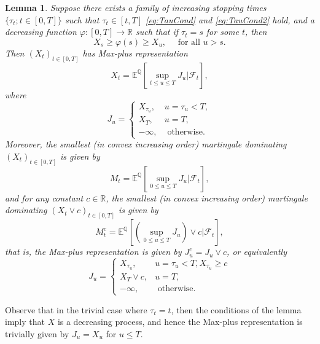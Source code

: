 \documentclass[a4paper]{amsart}
\newtheorem{lemma}[theorem]{Lemma}
\theoremstyle{definition}
\theoremstyle{remark}
\numberwithin{equation}{section}
\newcommand{\E}{\mathbb{E}}
\newcommand{\Q}{\mathbb{Q}}
\newcommand{\R}{\mathbb{R}}
\newcommand{\Fc}{\mathcal{F}}
\newcommand{\Eq}[1]{\E^{\Q}\left[#1\right]}
\begin{document}
\begin{lemma}\label{lemma:A1}
  Suppose there exists a family of increasing stopping times $\{\tau_t; t\in[0,T]\}$ such that $\tau_t \in [t,T]$ \eqref{eq:TauCond} and \eqref{eq:TauCond2} hold, and a decreasing function $\varphi:[0,T] \to \R$ such that if $\tau_t = s$ for some $t$, then
  \begin{equation*}
    X_s \ge \varphi(s) \ge X_u, \quad \text{ for all } u > s.
  \end{equation*}
  Then $(X_t)_{t \in [0,T]}$ has Max-plus representation
  \begin{equation*}
    X_t = \Eq{\sup_{t \le u \le T} J_u | \Fc_t},
  \end{equation*}
  where
  \begin{equation*}
    J_u = 
    \begin{cases}
      X_{\tau_u}, & u= \tau_u < T, \\
      X_T, & u = T, \\
      -\infty, & \text{ otherwise}.
    \end{cases}
  \end{equation*}
  Moreover, the smallest (in convex increasing order) martingale dominating $(X_t)_{t \in [0,T]}$ is given by
  \begin{equation*}
    M_t = \Eq{\sup_{0 \le u \le T} J_u | \Fc_t},
  \end{equation*}
  and for any constant $c \in \R$, the smallest (in convex increasing order) martingale dominating $(X_t \vee c)_{t \in [0,T]}$ is given by
  \begin{equation*}
    M_t^c = \Eq{\left(\sup_{0 \le u \le T} J_u\right) \vee c | \Fc_t},
  \end{equation*}
  that is, the Max-plus representation is given by $J_u^c = J_u \vee c$, or equivalently
  \begin{equation*}
    J_u = 
    \begin{cases}
      X_{\tau_u}, & u= \tau_u < T, X_{\tau_u} \ge c \\
      X_T \vee c, & u = T, \\
      -\infty, & \text{ otherwise}.
    \end{cases}
  \end{equation*}
\end{lemma}

Observe that in the trivial case where $\tau_t = t$, then the conditions of the lemma imply that $X$ is a decreasing process, and hence the Max-plus representation is trivially given by $J_u = X_u$ for $u \le T$.
\end{document}
